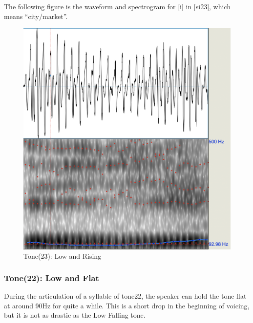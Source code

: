 \documentclass[a4paper]{article}
\begin{document}
The following figure is the waveform and spectrogram for [i] in [si23], which means ``city/market''.
\begin{figure}[H]
    \centering
    \includegraphics[scale=0.4]{imgs/tone23.png}
    \caption{Tone(23): Low and Rising}
\end{figure}

\subsubsection{Tone(22): Low and Flat}
During the articulation of a syllable of tone22, the speaker can hold the tone flat at around 90Hz for quite a while. This is a short drop in the beginning of voicing, but it is not as drastic as the Low Falling tone. 
\end{document}
